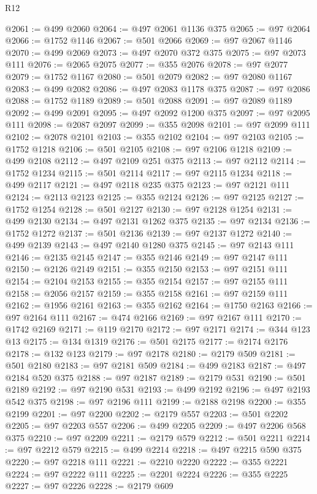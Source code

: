 \begin{lexlean}{R12}
\begin{coremodule}
@2061 := @499 @2060
@2064 := @497 @2061 @1136 @375
@2065 := @97 @2064
@2066 := @1752 @1146
@2067 := @501 @2066
@2069 := @97 @2067 @1146
@2070 := @499 @2069
@2073 := @497 @2070 @372 @375
@2075 := @97 @2073 @111
@2076 := @2065 @2075
@2077 := @355 @2076
@2078 := @97 @2077
@2079 := @1752 @1167
@2080 := @501 @2079
@2082 := @97 @2080 @1167
@2083 := @499 @2082
@2086 := @497 @2083 @1178 @375
@2087 := @97 @2086
@2088 := @1752 @1189
@2089 := @501 @2088
@2091 := @97 @2089 @1189
@2092 := @499 @2091
@2095 := @497 @2092 @1200 @375
@2097 := @97 @2095 @111
@2098 := @2087 @2097
@2099 := @355 @2098
@2101 := @97 @2099 @111
@2102 := @2078 @2101
@2103 := @355 @2102
@2104 := @97 @2103
@2105 := @1752 @1218
@2106 := @501 @2105
@2108 := @97 @2106 @1218
@2109 := @499 @2108
@2112 := @497 @2109 @251 @375
@2113 := @97 @2112
@2114 := @1752 @1234
@2115 := @501 @2114
@2117 := @97 @2115 @1234
@2118 := @499 @2117
@2121 := @497 @2118 @235 @375
@2123 := @97 @2121 @111
@2124 := @2113 @2123
@2125 := @355 @2124
@2126 := @97 @2125
@2127 := @1752 @1254
@2128 := @501 @2127
@2130 := @97 @2128 @1254
@2131 := @499 @2130
@2134 := @497 @2131 @1262 @375
@2135 := @97 @2134
@2136 := @1752 @1272
@2137 := @501 @2136
@2139 := @97 @2137 @1272
@2140 := @499 @2139
@2143 := @497 @2140 @1280 @375
@2145 := @97 @2143 @111
@2146 := @2135 @2145
@2147 := @355 @2146
@2149 := @97 @2147 @111
@2150 := @2126 @2149
@2151 := @355 @2150
@2153 := @97 @2151 @111
@2154 := @2104 @2153
@2155 := @355 @2154
@2157 := @97 @2155 @111
@2158 := @2056 @2157
@2159 := @355 @2158
@2161 := @97 @2159 @111
@2162 := @1956 @2161
@2163 := @355 @2162
@2164 := @1750 @2163
@2166 := @97 @2164 @111
@2167 := @474 @2166
@2169 := @97 @2167 @111
@2170 := @1742 @2169
@2171 := @119 @2170
@2172 := @97 @2171
@2174 := @344 @123 @13
@2175 := @134 @1319
@2176 := @501 @2175
@2177 := @2174 @2176
@2178 := @132 @123
@2179 := @97 @2178
@2180 := @2179 @509
@2181 := @501 @2180
@2183 := @97 @2181 @509
@2184 := @499 @2183
@2187 := @497 @2184 @520 @375
@2188 := @97 @2187
@2189 := @2179 @531
@2190 := @501 @2189
@2192 := @97 @2190 @531
@2193 := @499 @2192
@2196 := @497 @2193 @542 @375
@2198 := @97 @2196 @111
@2199 := @2188 @2198
@2200 := @355 @2199
@2201 := @97 @2200
@2202 := @2179 @557
@2203 := @501 @2202
@2205 := @97 @2203 @557
@2206 := @499 @2205
@2209 := @497 @2206 @568 @375
@2210 := @97 @2209
@2211 := @2179 @579
@2212 := @501 @2211
@2214 := @97 @2212 @579
@2215 := @499 @2214
@2218 := @497 @2215 @590 @375
@2220 := @97 @2218 @111
@2221 := @2210 @2220
@2222 := @355 @2221
@2224 := @97 @2222 @111
@2225 := @2201 @2224
@2226 := @355 @2225
@2227 := @97 @2226
@2228 := @2179 @609

\end{coremodule}
\end{lexlean}
